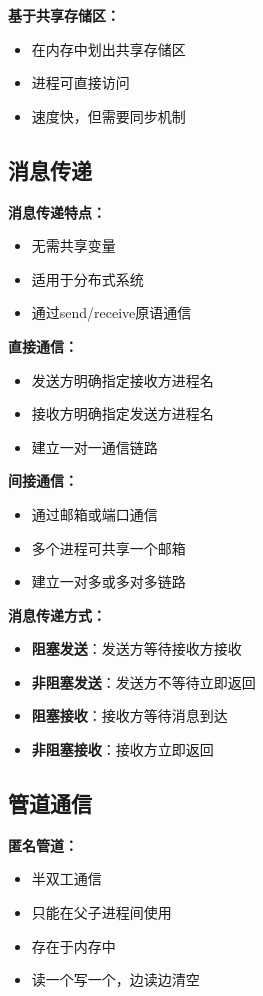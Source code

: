 \documentclass[lang=cn,newtx,10pt,scheme=chinese]{../../elegantbook}
\begin{document}
\textbf{基于共享存储区：}
\begin{itemize}
  \item 在内存中划出共享存储区
  \item 进程可直接访问
  \item 速度快，但需要同步机制
\end{itemize}

\subsection{消息传递}

\textbf{消息传递特点：}
\begin{itemize}
  \item 无需共享变量
  \item 适用于分布式系统
  \item 通过send/receive原语通信
\end{itemize}

\textbf{直接通信：}
\begin{itemize}
  \item 发送方明确指定接收方进程名
  \item 接收方明确指定发送方进程名
  \item 建立一对一通信链路
\end{itemize}

\textbf{间接通信：}
\begin{itemize}
  \item 通过邮箱或端口通信
  \item 多个进程可共享一个邮箱
  \item 建立一对多或多对多链路
\end{itemize}

\textbf{消息传递方式：}
\begin{itemize}
  \item \textbf{阻塞发送}：发送方等待接收方接收
  \item \textbf{非阻塞发送}：发送方不等待立即返回
  \item \textbf{阻塞接收}：接收方等待消息到达
  \item \textbf{非阻塞接收}：接收方立即返回
\end{itemize}

\subsection{管道通信}

\textbf{匿名管道：}
\begin{itemize}
  \item 半双工通信
  \item 只能在父子进程间使用
  \item 存在于内存中
  \item 读一个写一个，边读边清空
\end{itemize}
\end{document}

